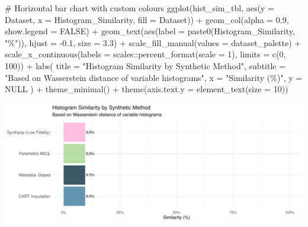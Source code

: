 \documentclass[
  letterpaper,
  DIV=11,
  numbers=noendperiod]{scrartcl}
\newenvironment{Shaded}{\begin{snugshade}}{\end{snugshade}}
\newcommand{\AttributeTok}[1]{\textcolor[rgb]{0.40,0.45,0.13}{#1}}
\newcommand{\CommentTok}[1]{\textcolor[rgb]{0.37,0.37,0.37}{#1}}
\newcommand{\ConstantTok}[1]{\textcolor[rgb]{0.56,0.35,0.01}{#1}}
\newcommand{\DecValTok}[1]{\textcolor[rgb]{0.68,0.00,0.00}{#1}}
\newcommand{\FloatTok}[1]{\textcolor[rgb]{0.68,0.00,0.00}{#1}}
\newcommand{\FunctionTok}[1]{\textcolor[rgb]{0.28,0.35,0.67}{#1}}
\newcommand{\NormalTok}[1]{\textcolor[rgb]{0.00,0.23,0.31}{#1}}
\newcommand{\SpecialCharTok}[1]{\textcolor[rgb]{0.37,0.37,0.37}{#1}}
\newcommand{\StringTok}[1]{\textcolor[rgb]{0.13,0.47,0.30}{#1}}
\begin{document}
\begin{Shaded}
\begin{Highlighting}[]
\CommentTok{\# Horizontal bar chart with custom colours}
\FunctionTok{ggplot}\NormalTok{(hist\_sim\_tbl, }\FunctionTok{aes}\NormalTok{(}\AttributeTok{y =}\NormalTok{ Dataset, }\AttributeTok{x =}\NormalTok{ Histogram\_Similarity, }\AttributeTok{fill =}\NormalTok{ Dataset)) }\SpecialCharTok{+}
  \FunctionTok{geom\_col}\NormalTok{(}\AttributeTok{alpha =} \FloatTok{0.9}\NormalTok{, }\AttributeTok{show.legend =} \ConstantTok{FALSE}\NormalTok{) }\SpecialCharTok{+}
  \FunctionTok{geom\_text}\NormalTok{(}\FunctionTok{aes}\NormalTok{(}\AttributeTok{label =} \FunctionTok{paste0}\NormalTok{(Histogram\_Similarity, }\StringTok{"\%"}\NormalTok{)), }
            \AttributeTok{hjust =} \SpecialCharTok{{-}}\FloatTok{0.1}\NormalTok{, }\AttributeTok{size =} \FloatTok{3.3}\NormalTok{) }\SpecialCharTok{+}
  \FunctionTok{scale\_fill\_manual}\NormalTok{(}\AttributeTok{values =}\NormalTok{ dataset\_palette) }\SpecialCharTok{+}
  \FunctionTok{scale\_x\_continuous}\NormalTok{(}\AttributeTok{labels =}\NormalTok{ scales}\SpecialCharTok{::}\FunctionTok{percent\_format}\NormalTok{(}\AttributeTok{scale =} \DecValTok{1}\NormalTok{), }\AttributeTok{limits =} \FunctionTok{c}\NormalTok{(}\DecValTok{0}\NormalTok{, }\DecValTok{100}\NormalTok{)) }\SpecialCharTok{+}
  \FunctionTok{labs}\NormalTok{(}
    \AttributeTok{title =} \StringTok{"Histogram Similarity by Synthetic Method"}\NormalTok{,}
    \AttributeTok{subtitle =} \StringTok{"Based on Wasserstein distance of variable histograms"}\NormalTok{,}
    \AttributeTok{x =} \StringTok{"Similarity (\%)"}\NormalTok{, }\AttributeTok{y =} \ConstantTok{NULL}
\NormalTok{  ) }\SpecialCharTok{+}
  \FunctionTok{theme\_minimal}\NormalTok{() }\SpecialCharTok{+}
  \FunctionTok{theme}\NormalTok{(}\AttributeTok{axis.text.y =} \FunctionTok{element\_text}\NormalTok{(}\AttributeTok{size =} \DecValTok{10}\NormalTok{))}
\end{Highlighting}
\end{Shaded}

\begin{center}
\includegraphics[width=1\linewidth,height=\textheight,keepaspectratio]{heart_failure_synthetic_data_project_files/figure-pdf/histogram-similarity-score-1.pdf}
\end{center}
\end{document}
